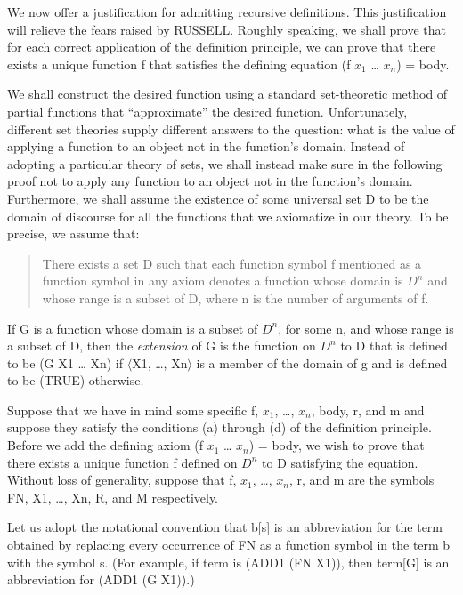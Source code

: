 \documentclass[10pt]{book}
\newenvironment{pubcrown}{\begin{quote}}{\end{quote}}
\begin{document}
We now offer a justification for admitting recursive definitions.
This justification will relieve the fears raised by RUSSELL.
Roughly speaking, we shall prove that for each correct
application of the definition principle, we can prove
that there exists a unique function f that satisfies the
defining equation (f $x_{1}$ \ldots{} $x_{n}$) =  body.

We shall construct the desired function using a standard set-theoretic
method of partial functions that ``approximate'' the desired
function.  Unfortunately, different set theories supply different
answers to the question:  what is the value of applying a
function to an object not in the function's domain. Instead
of adopting a particular theory of sets, we shall instead
make sure in the following proof not to apply any function
to an object not in the function's domain.  Furthermore, we
shall assume the existence of some universal set D to be the
domain of discourse for all the functions that we axiomatize
in our theory.  To be precise, we assume that:
\begin{pubcrown}
There exists a set D such that each function symbol f
mentioned as a function symbol in any axiom denotes a
function whose domain is $D^{n}$ and whose range is a subset of
D, where n is the number of arguments of f.
\end{pubcrown}

If G is a function whose domain is a subset of $D^{n}$, for some n, and whose
range is a subset of D, then the
\emph{extension} of G is the function on $D^{n}$ to D that is
defined to be (G X1 \ldots{} Xn) if $\langle$X1, \ldots{}, Xn$\rangle$
is a member of the domain of g and is defined to be (TRUE) otherwise.

Suppose that we have in mind some specific f, $x_{1}$, \ldots{}, $x_{n}$,
body, r, and m and suppose they satisfy the conditions (a)
through (d) of the definition principle.  Before we add the
defining axiom (f $x_{1}$ \ldots{} $x_{n}$) = body, we wish to prove
that there exists a unique function f defined on $D^{n}$ to D
satisfying the equation.  Without loss of generality,
suppose
that f, $x_{1}$, \ldots{}, $x_{n}$, r, and m are the symbols FN, X1, \ldots{}, Xn, R, and M respectively.

Let us adopt the notational convention that b[s] is an
abbreviation for the term obtained by replacing every
occurrence of FN as a function symbol in the term b with the
symbol s.  (For example, if term is (ADD1 (FN X1)), then
term[G] is an abbreviation for (ADD1 (G X1)).)
\end{document}
